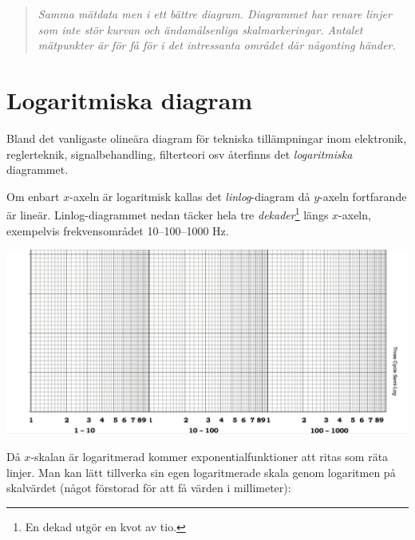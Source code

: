\documentclass[onepage,swedish,a4paper,12pt]{scrbook}
\begin{document}
\begin{quote}
\emph{Samma mätdata men i ett bättre diagram. Diagrammet har renare linjer som inte stör kurvan och ändamålsenliga skalmarkeringar. Antalet mätpunkter är för få för i det intressanta området där någonting händer.}
\end{quote}

\section*{Logaritmiska diagram}

Bland det vanligaste olineära diagram för tekniska tillämpningar inom elektronik, reglerteknik, signalbehandling, filterteori osv återfinns det \emph{logaritmiska} 
diagrammet. 

Om enbart $x$-axeln är logaritmisk kallas det \emph{linlog}-diagram då $y$-axeln fortfarande är lineär. Linlog-diagrammet nedan täcker hela tre \emph{dekader}\footnote{En dekad utgör en kvot av tio.} längs $x$-axeln, exempelvis frekvensområdet 10--100--1000 Hz.

 
\begin{center}
\includegraphics[scale=0.4]{linlog-skala.pdf}
\end{center}

Då $x$-skalan är logaritmerad kommer exponentialfunktioner att ritas som räta linjer. Man kan lätt tillverka sin egen logaritmerade skala genom logaritmen på skalvärdet (något förstorad för att få värden i millimeter):
\end{document}
